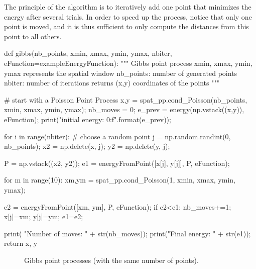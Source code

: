 The principle of the algorithm is to iteratively add one point that minimizes the energy after several trials. In order to speed up the process, notice that only one point is moved, and it is thus sufficient to only compute the distances from this point to all others.
\begin{python}
def gibbs(nb_points, xmin, xmax, ymin, ymax, nbiter, eFunction=exampleEnergyFunction):
    """
    Gibbs point process
    xmin, xmax, ymin, ymax represents the spatial window
    nb_points: number of generated points
    nbiter: number of iterations
    returns (x,y) coordinates of the points
    """
    
    # start with a Poisson Point Process
    x,y = spat_pp.cond_Poisson(nb_points, xmin, xmax, ymin, ymax);
    nb_moves = 0;
    e_prev = energy(np.vstack((x,y)), eFunction);
    print("initial energy: {0:f}".format(e_prev));

    for i in range(nbiter):
        # choose a random point
        j = np.random.randint(0, nb_points);
        x2 = np.delete(x, j);
        y2 = np.delete(y, j);
        
        P = np.vstack((x2, y2));
        e1 = energyFromPoint([x[j], y[j]], P, eFunction);
        
        for m in range(10):
            xm,ym = spat_pp.cond_Poisson(1, xmin, xmax, ymin, ymax);
            
            e2 = energyFromPoint([xm, ym], P, eFunction);
            if e2<e1:
                nb_moves+=1;
                x[j]=xm;
                y[j]=ym;
                e1=e2;
          
    print( "Number of moves: " + str(nb_moves));
    print("Final energy:    " + str(e1));
    return x, y
\end{python}

\begin{figure}[H]
 \centering\caption{Gibbs point processes (with the same number of points).}%
 \hfill
 \label{fig:point_process_generation:python:gpp}%
\end{figure}

